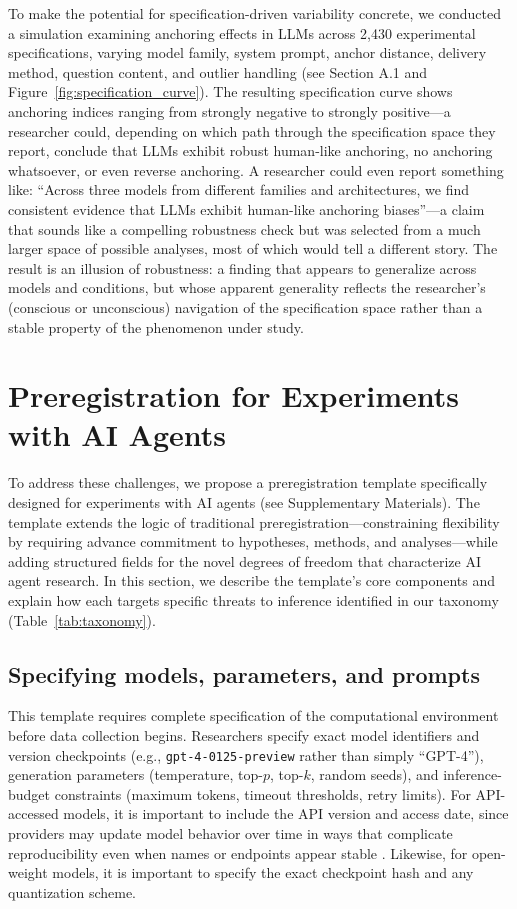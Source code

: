 \documentclass{article}
\theoremstyle{plain}
\theoremstyle{definition}
\theoremstyle{remark}
\begin{document}
To make the potential for specification-driven variability concrete, we conducted a simulation examining anchoring effects in LLMs across 2,430 experimental specifications, varying model family, system prompt, anchor distance, delivery method, question content, and outlier handling (see Section A.1 and Figure~\ref{fig:specification_curve}). The resulting specification curve shows anchoring indices ranging from strongly negative to strongly positive---a researcher could, depending on which path through the specification space they report, conclude that LLMs exhibit robust human-like anchoring, no anchoring whatsoever, or even reverse anchoring. A researcher could even report something like: ``Across three models from different families and architectures, we find consistent evidence that LLMs exhibit human-like anchoring biases''---a claim that sounds like a compelling robustness check but was selected from a much larger space of possible analyses, most of which would tell a different story. The result is an illusion of robustness: a finding that appears to generalize across models and conditions, but whose apparent generality reflects the researcher's (conscious or unconscious) navigation of the specification space rather than a stable property of the phenomenon under study.

\section{Preregistration for Experiments with AI Agents}\label{sec:template}

To address these challenges, we propose a preregistration template specifically designed for experiments with AI agents (see Supplementary Materials). The template extends the logic of traditional preregistration---constraining flexibility by requiring advance commitment to hypotheses, methods, and analyses---while adding structured fields for the novel degrees of freedom that characterize AI agent research. In this section, we describe the template's core components and explain how each targets specific threats to inference identified in our taxonomy (Table~\ref{tab:taxonomy}).

\subsection{Specifying models, parameters, and prompts}

This template requires complete specification of the computational environment before data collection begins. Researchers specify exact model identifiers and version checkpoints (e.g., \texttt{gpt-4-0125-preview} rather than simply ``GPT-4''), generation parameters (temperature, top-$p$, top-$k$, random seeds), and inference-budget constraints (maximum tokens, timeout thresholds, retry limits). For API-accessed models, it is important to include the API version and access date, since providers may update model behavior over time in ways that complicate reproducibility even when names or endpoints appear stable \citep{chen2023chatgptdrift}. Likewise, for open-weight models, it is important to specify the exact checkpoint hash and any quantization scheme.
\end{document}

